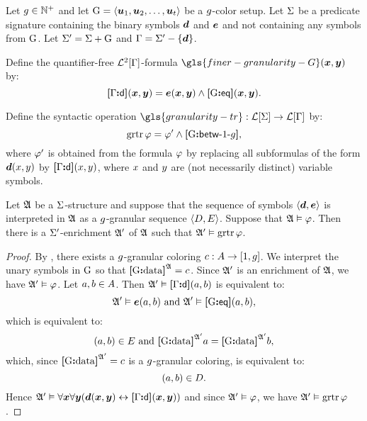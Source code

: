 Let $g \in \mathbb{N}^{+}$ and let ${\mathrm{G}} = \left\langle \bm{u}_{1},\bm{u}_{2},\dots,\bm{u}_{t} \right\rangle$ be a
$g$-color setup.
Let $\mathrm{\Sigma}$ be a predicate signature containing the binary symbols
$\bm{d}$ and $\bm{e}$ and not containing any symbols from ${\mathrm{G}}$.
Let $\mathrm{\Sigma'} = \mathrm{\Sigma} + {\mathrm{G}}$ and $\mathrm{\Gamma} = \mathrm{\Sigma'} - \left\{\bm{d}\right\}$.

\begin{definition}
Define the quantifier-free $\mathcal{L}^{2}[\mathrm{\Gamma}]$-formula
$\gls{finer-granularity-G}(\xx,\yy)$ by:
\[
  {\bm{[}\mathrm{\Gamma}\mathord{\bm{:}}\mathsf{d}\bm{]}}(\bm{x},\bm{y}) = \bm{e}(\bm{x},\bm{y}) \land {\bm{[}{\mathrm{G}}\mathord{\bm{:}}\mathsf{eq}\bm{]}}(\bm{x},\bm{y}).
\]
\end{definition}
\begin{definition}
Define the syntactic operation
$\gls{granularity-tr} : \FoF\SigS \to \FoF\SigG$ by:
\[
  \operatorname{grtr}\varphi = {\varphi'} \land {\bm{[}{\mathrm{G}}\mathord{\bm{:}}\mathsf{betw}{\hbox{-}}1{\hbox{-}}g\bm{]}},
\]
where ${\varphi'}$ is obtained from the formula $\varphi$ by replacing all subformulas
of the form $\bm{d}(x,y)$ by ${\bm{[}\mathrm{\Gamma}\mathord{\bm{:}}\mathsf{d}\bm{]}}(x,y)$, where $x$ and $y$ are
(not necessarily distinct) variable symbols.
\end{definition}

\begin{lemma}\label{lem:granular-f-to-tr}
Let $\mathfrak{A}$ be a $\mathrm{\Sigma}$-structure and suppose that the sequence of
symbols $\left\langle \bm{d},\bm{e} \right\rangle$ is interpreted in $\mathfrak{A}$ as a
$g$-granular sequence $\left\langle D,E \right\rangle$.
Suppose that $\mathfrak{A} \vDash \varphi$.
Then there is a $\mathrm{\Sigma'}$-enrichment $\mathfrak{A'}$ of $\mathfrak{A}$ such that
$\mathfrak{A'} \vDash \operatorname{grtr}\varphi$.
\end{lemma}
\begin{proof}
By , there exists a $g$-granular coloring 
$c : A \to [1,g]$.
We interpret the unary symbols in ${\mathrm{G}}$ so that ${\bm{[}{\mathrm{G}}\mathord{\bm{:}}\mathrm{data}\bm{]}}^{\mathfrak{A}} = c$.
Since $\mathfrak{A'}$ is an enrichment of $\mathfrak{A}$, we have $\mathfrak{A'} \vDash \varphi$.
Let $a, b \in A$.
Then $\mathfrak{A'} \vDash {\bm{[}\mathrm{\Gamma}\mathord{\bm{:}}\mathsf{d}\bm{]}}(a,b)$ is equivalent to:
\[
  \mathfrak{A'} \vDash \bm{e}(a,b) \text{ and } \mathfrak{A'} \vDash {\bm{[}{\mathrm{G}}\mathord{\bm{:}}\mathsf{eq}\bm{]}}(a,b),
\]
which is equivalent to:
\[
  (a,b) \in E \text{ and } {\bm{[}{\mathrm{G}}\mathord{\bm{:}}\mathrm{data}\bm{]}}^{\mathfrak{A'}}a = {\bm{[}{\mathrm{G}}\mathord{\bm{:}}\mathrm{data}\bm{]}}^{\mathfrak{A'}}b,
\]
which, since ${\bm{[}{\mathrm{G}}\mathord{\bm{:}}\mathrm{data}\bm{]}}^{\mathfrak{A'}} = c$ is a $g$-granular coloring, is
equivalent to:
\[
  (a,b) \in D.
\]
Hence $\mathfrak{A'} \vDash \forall\bm{x}\forall\bm{y}(\bm{d}(\bm{x},\bm{y}) \leftrightarrow {\bm{[}\mathrm{\Gamma}\mathord{\bm{:}}\mathsf{d}\bm{]}}(\bm{x},\bm{y}))$
and since $\mathfrak{A'} \vDash \varphi$, we have $\mathfrak{A'} \vDash \operatorname{grtr}\varphi$.
\end{proof}

